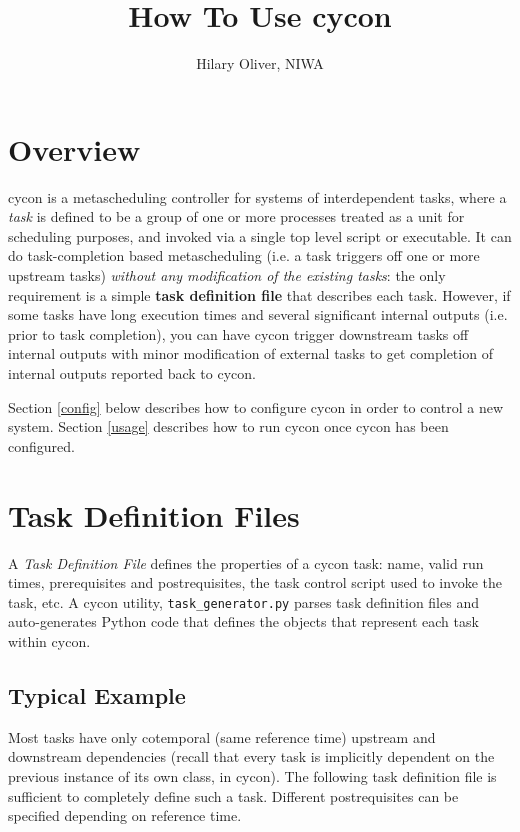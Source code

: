 \documentclass[11pt,a4paper]{article}
\title{How To Use cycon}
\author{Hilary Oliver, NIWA}
\begin{document}
\maketitle
\tableofcontents

\section{Overview}

cycon is a metascheduling controller for systems of interdependent
tasks, where a {\em task} is defined to be a group of one or more
processes treated as a unit for scheduling purposes, and invoked via a
single top level script or executable.  It can do task-completion based
metascheduling (i.e. a task triggers off  one or more
upstream tasks) {\em without any modification of the existing tasks}:
the only requirement is a simple \textbf{task definition file} that
describes each task. However, if some tasks have long execution times
and several significant internal outputs (i.e. prior to task
completion), you can have cycon trigger downstream tasks off internal
outputs with minor modification of external tasks to get completion of
internal outputs reported back to cycon. 

Section \ref{config} below describes how to configure cycon in order to
control a new system.  Section \ref{usage} describes how to run cycon
once cycon has been configured.

\label{config}
\section{Task Definition Files}

A {\em Task Definition File} defines the properties of a cycon task:
name, valid run times, prerequisites and postrequisites, the task
control script used to invoke the task, etc.  A cycon utility,
\verb=task_generator.py= parses task definition files and auto-generates
Python code that defines the objects that represent each task within
cycon.

\subsection{Typical Example}

Most tasks have only cotemporal (same reference time) upstream and
downstream dependencies (recall that every task is implicitly dependent
on the previous instance of its own class, in cycon). The following
task definition file is sufficient to completely define such a task.
Different postrequisites can be specified depending on reference time. 
\end{document}
